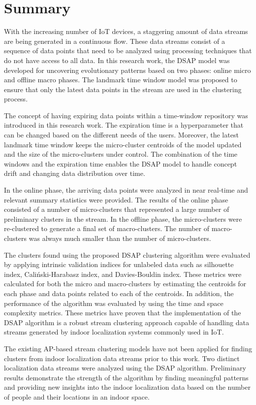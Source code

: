 \section{Summary}

With the increasing number of IoT devices, a staggering amount of data streams are being generated in a continuous flow. These data streams consist of a sequence of data points that need to be analyzed using processing techniques that do not have access to all data. In this research work, the DSAP model was developed for uncovering evolutionary patterns based on two phases: online micro and offline macro phases. The landmark time window model was proposed to ensure that only the latest data points in the stream are used in the clustering process.

The concept of having expiring data points within a time-window repository was introduced in this research work. The expiration time is a hyperparameter that can be changed based on the different needs of the users. Moreover, the latest landmark time window keeps the micro-cluster centroids of the model updated and the size of the micro-clusters under control. The combination of the time windows and the expiration time enables the DSAP model to handle concept drift and changing data distribution over time.

In the online phase, the arriving data points were analyzed in near real-time and relevant summary statistics were provided. The results of the online phase consisted of a number of micro-clusters that represented a large number of preliminary clusters in the stream. In the offline phase, the micro-clusters were re-clustered to generate a final set of macro-clusters. The number of macro-clusters was always much smaller than the number of micro-clusters.

The clusters found using the proposed DSAP clustering algorithm were evaluated by applying intrinsic validation indices for unlabeled data such as silhouette index, Caliński-Harabasz index, and Davies-Bouldin index. These metrics were calculated for both the micro and macro-clusters by estimating the centroids for each phase and data points related to each of the centroids. In addition, the performance of the algorithm was evaluated by using the time and space complexity metrics. These metrics have proven that the implementation of the DSAP algorithm is a robust stream clustering approach capable of handling data streams generated by indoor localization systems commonly used in IoT.

The existing AP-based stream clustering models have not been applied for finding clusters from indoor localization data streams prior to this work. Two distinct localization data streams were analyzed using the DSAP algorithm. Preliminary results demonstrate the strength of the algorithm by finding meaningful patterns and providing new insights into the indoor localization data based on the number of people and their locations in an indoor space. 


